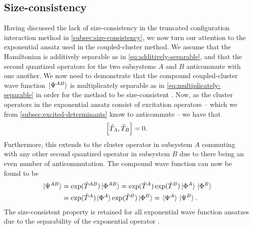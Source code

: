         \subsection{Size-consistency}
            Having discussed the lack of size-consistency in the truncated
            configuration interaction method in
            \autoref{subsec:size-consistency}, we now turn our attention to the
            exponential ansatz used in the coupled-cluster method.
            We assume that the Hamiltonian is additively separable as in
            \autoref{eq:additively-separable}, and that the second quantized
            operators for the two subsystems $A$ and $B$ anticommute with one
            another.
            We now need to demonstrate that the compound coupled-cluster wave
            function $\ket*{\Psi^{AB}}$ is multiplicately separable as in
            \autoref{eq:multiplicately-separable} in order for the method to be
            size-consistent \cite{helgaker-molecular}.
            Now, as the cluster operators in the exponential ansatz consist of
            excitation operators -- which we from
            \autoref{subsec:excited-determinants} know to anticommute -- we have
            that
            \begin{align}
                \left[\hat{T}_{A}, \hat{T}_{B}\right] = 0.
            \end{align}
            Furthermore, this extends to the cluster operator in subsystem $A$
            commuting with any other second quantized operator in subsystem $B$
            due to there being an even number of anticommutation.
            The compound wave function can now be found to be
            \begin{align}
                \ket*{\Psi^{AB}}
                &= \exponential(\clust^{AB})\ket*{\slat^{AB}}
                =
                \exponential(\clust^{A})\exponential(\clust^{B})
                \ket*{\slat^{A}}\ket*{\slat^{B}}
                \\
                &=
                \exponential(\clust^{A})\ket*{\slat^{A}}
                \exponential(\clust^{B})\ket*{\slat^{B}}
                = \ket*{\Psi^{A}}\ket*{\Psi^{B}}.
            \end{align}
            The size-consistent property is retained for all exponential wave
            function ansatzes due to the separability of the exponential
            operator \cite{helgaker-molecular, size-extensivity}.

